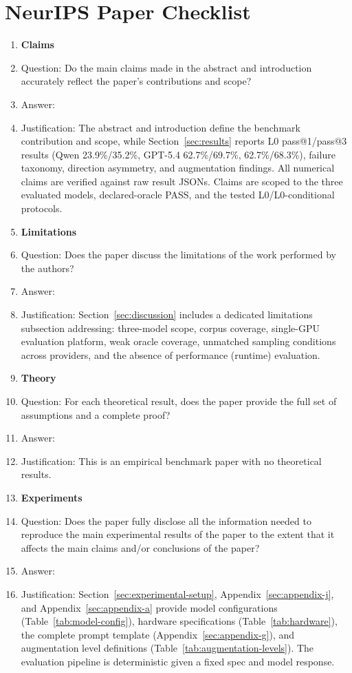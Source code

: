 \section*{NeurIPS Paper Checklist}
{
\begin{enumerate}

\item {\bf Claims}
    \item[] Question: Do the main claims made in the abstract and introduction accurately reflect the paper's contributions and scope?
    \item[] Answer: \answerYes{}
    \item[] Justification: The abstract and introduction define the benchmark contribution and scope, while Section~\ref{sec:results} reports L0 pass@1/pass@3 results (Qwen 23.9\%/35.2\%, GPT-5.4 62.7\%/69.7\%, \codex{} 62.7\%/68.3\%), failure taxonomy, direction asymmetry, and augmentation findings. All numerical claims are verified against raw result JSONs. Claims are scoped to the three evaluated models, declared-oracle PASS, and the tested L0/L0-conditional protocols.

\item {\bf Limitations}
    \item[] Question: Does the paper discuss the limitations of the work performed by the authors?
    \item[] Answer: \answerYes{}
    \item[] Justification: Section~\ref{sec:discussion} includes a dedicated limitations subsection addressing: three-model scope,
   corpus coverage, single-GPU evaluation platform, weak oracle coverage, unmatched sampling conditions across providers, and the   
  absence of performance (runtime) evaluation.

\item {\bf Theory}
    \item[] Question: For each theoretical result, does the paper provide the full set of assumptions and a complete proof?
    \item[] Answer: \answerNA{}
    \item[] Justification: This is an empirical benchmark paper with no theoretical results.

\item {\bf Experiments}
    \item[] Question: Does the paper fully disclose all the information needed to reproduce the main experimental results of the paper to the extent that it affects the main claims and/or conclusions of the paper?
    \item[] Answer: \answerYes{}
    \item[] Justification: Section~\ref{sec:experimental-setup}, Appendix~\ref{sec:appendix-j}, and Appendix~\ref{sec:appendix-a} provide model configurations (Table~\ref{tab:model-config}), hardware specifications (Table~\ref{tab:hardware}), the complete prompt template (Appendix~\ref{sec:appendix-g}), and augmentation level definitions (Table~\ref{tab:augmentation-levels}). The evaluation pipeline is deterministic given a fixed spec and model response.


\end{enumerate}}
